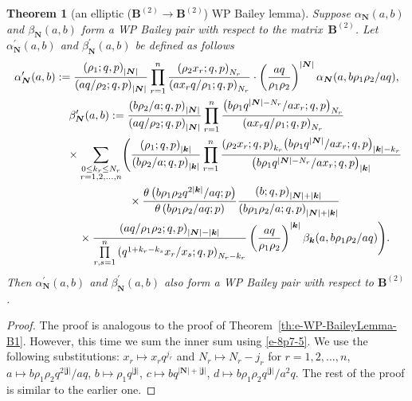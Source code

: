 \documentclass[pdftex]{sigma}
\numberwithin{equation}{section}
\newtheorem{Theorem}{Theorem}[section]
\newcommand{\sumN}{{\left| \boldsymbol{N} \right|}}
\newcommand\sumj{{\left| \boldsymbol {j} \right|}}
\newcommand\sumk{{\left| \boldsymbol{k} \right|}}
\newcommand{\B}{{ \mathbf B}}
\newcommand{\N}{{ \boldsymbol N}}
\renewcommand{\k}{{ \boldsymbol{k}}}
\newcommand{\multsum}[3]{{\sum\limits_{\substack{{0\le #1_#3 \le #2_#3} \\
{#3 =1,2,\dots, n}}}}}
\newcommand{\sqprod}[1]{\prod\limits_{r, s =1}^{#1}} %
\newcommand{\smallprod}[1]{\prod\limits_{r =1}^{#1}} %
\newcommand{\xover}[1]{#1_{r}/#1_{s}}
\newcommand{\ellipticqrfac}[2]{{\left({#1}; q, p\right)_{#2}}} %
\newcommand{\elliptictheta}[1]{\theta \left({#1} ; p\right) }
\begin{document}
\begin{Theorem}[an elliptic ($\B^{(2)}\to\B^{(2)}$) WP Bailey lemma] \label{th:e-WP-BaileyLemma-B2-B2}
Suppose $\alpha_\N(a,b)$ and $\beta_\N(a,b)$ form a WP Bailey pair with respect to the matrix~$\B^{(2)}$. Let ${\alpha}^{\prime}_\N(a,b)$ and ${\beta}^{\prime}_\N(a,b)$ be defined as follows
\begin{gather*}
{\alpha}^{\prime}_\N(a,b) :=
\frac{\ellipticqrfac{\rho_1 }{\sumN}}{\ellipticqrfac{aq/\rho_2}{\sumN}}
 \smallprod n \frac{\ellipticqrfac{\rho_2x_r}{N_r}}
{\ellipticqrfac{ax_rq/\rho_1}{N_r}} \cdot
\left(\frac{aq}{\rho_1\rho_2}\right)^{\sumN} \alpha_\N(a, b\rho_1\rho_2/aq),\\
{\beta}^{\prime}_\N (a,b) := \frac{\ellipticqrfac{b\rho_2/a }{\sumN}}{\ellipticqrfac{aq/\rho_2}{\sumN}}
 \smallprod n \frac{\ellipticqrfac{b\rho_1q^{\sumN-N_r}/ax_r}{N_r}}
{\ellipticqrfac{ax_rq/\rho_1}{N_r}}\notag \\
 \hphantom{{\beta}^{\prime}_\N (a,b) :=}{} \times \multsum{k}{N}{r} \Bigg(
\frac{ \ellipticqrfac{\rho_1}{\sumk} }{\ellipticqrfac{b\rho_2/a}{\sumk}}
\smallprod n \frac{\ellipticqrfac{\rho_2x_r}{k_r}
\ellipticqrfac{b\rho_1q^{\sumN}/ax_r}{\sumk-k_r} }
{\ellipticqrfac{b\rho_1q^{\sumN-N_r}/ax_r}{\sumk}} \notag \\
\hphantom{{\beta}^{\prime}_\N (a,b) :=}{}
\times \frac{\elliptictheta{ b\rho_1\rho_2q^{2\sumk}/{aq}}}{\elliptictheta{ b\rho_1\rho_2/{aq}}}
\frac{\ellipticqrfac{b}{\sumN+\sumk}}{\ellipticqrfac{b\rho_1\rho_2/a}{\sumN+\sumk}} \notag\\
\hphantom{{\beta}^{\prime}_\N (a,b) :=}{}
\times \frac{\ellipticqrfac{aq/\rho_1\rho_2}{\sumN-\sumk} }
{\sqprod n \ellipticqrfac{q^{1+k_r-k_s}\xover x }{N_r-k_r}}
\left(\frac{aq}{\rho_1\rho_2}\right)^{\sumk} \beta_\k(a,b\rho_1\rho_2/aq)\Bigg).%
\end{gather*}
Then ${\alpha}^{\prime}_\N(a,b)$ and ${\beta}^{\prime}_\N(a,b)$ also form a WP Bailey pair with respect to $\B^{(2)}$.
\end{Theorem}

\begin{proof}
The proof is analogous to the proof of Theorem~\ref{th:e-WP-BaileyLemma-B1}. However, this time we sum the inner sum using \eqref{e-8p7-5}. We use the following substitutions: $x_r\mapsto x_rq^{j_r}$ and $N_r\mapsto N_r-j_r$ for $r=1, 2, \dots, n$, $a\mapsto b\rho_1\rho_2q^{2\sumj}/aq$,
$b\mapsto \rho_1q^{\sumj}$, $c\mapsto bq^{\sumN+\sumj}$, $d\mapsto b\rho_1\rho_2q^{\sumj}/a^2q$. The rest of the proof is similar to the earlier one.
\end{proof}
\end{document}
